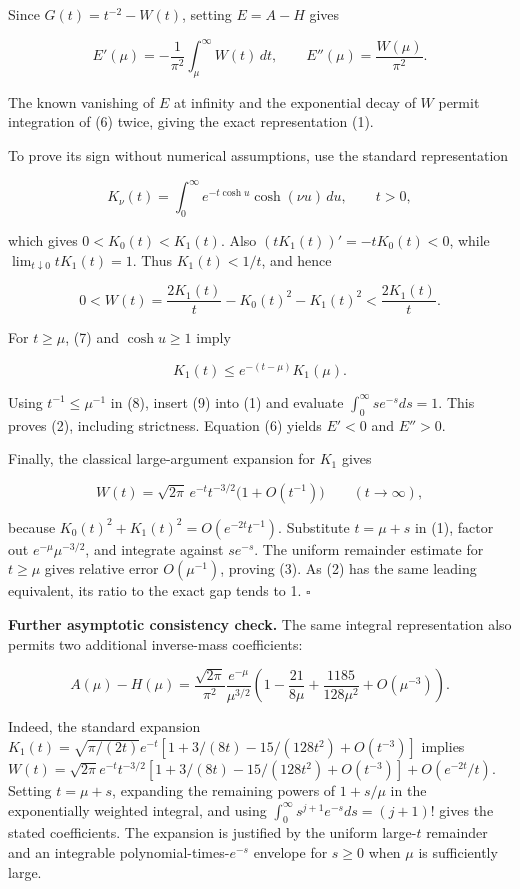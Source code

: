 \documentclass[
  10pt,
  a4paper,
]{article}
\begin{document}
Since \(G(t)=t^{-2}-W(t)\), setting \(E=A-H\) gives

\[
E'(\mu)=-\frac1{\pi^2}\int_\mu^\infty W(t)\,dt,
\qquad E''(\mu)=\frac{W(\mu)}{\pi^2}.
\tag{6}
\]

The known vanishing of \(E\) at infinity and the exponential decay of \(W\) permit integration of (6) twice, giving the exact representation (1).

To prove its sign without numerical assumptions, use the standard representation

\[
K_\nu(t)=\int_0^\infty e^{-t\cosh u}\cosh(\nu u)\,du,
\qquad t>0,
\tag{7}
\]

which gives \(0<K_0(t)<K_1(t)\). Also \((tK_1(t))'=-tK_0(t)<0\), while \(\lim_{t\downarrow0}tK_1(t)=1\). Thus \(K_1(t)<1/t\), and hence

\[
0<W(t)=\frac{2K_1(t)}t-K_0(t)^2-K_1(t)^2
<\frac{2K_1(t)}t.
\tag{8}
\]

For \(t\ge\mu\), (7) and \(\cosh u\ge1\) imply

\[
K_1(t)\le e^{-(t-\mu)}K_1(\mu).
\tag{9}
\]

Using \(t^{-1}\le\mu^{-1}\) in (8), insert (9) into (1) and evaluate \(\int_0^\infty se^{-s}ds=1\). This proves (2), including strictness. Equation (6) yields \(E'<0\) and \(E''>0\).

Finally, the classical large-argument expansion for \(K_1\) gives

\[
W(t)=\sqrt{2\pi}\,e^{-t}t^{-3/2}\bigl(1+O(t^{-1})\bigr)
\qquad(t\to\infty),
\tag{10}
\]

because \(K_0(t)^2+K_1(t)^2=O(e^{-2t}t^{-1})\). Substitute \(t=\mu+s\) in (1), factor out \(e^{-\mu}\mu^{-3/2}\), and integrate against \(se^{-s}\). The uniform remainder estimate for \(t\ge\mu\) gives relative error \(O(\mu^{-1})\), proving (3). As (2) has the same leading equivalent, its ratio to the exact gap tends to 1. \(\square\)

\textbf{Further asymptotic consistency check.} The same integral representation also permits two additional inverse-mass coefficients:

\[
A(\mu)-H(\mu)=\frac{\sqrt{2\pi}}{\pi^2}\frac{e^{-\mu}}{\mu^{3/2}}\left(1-\frac{21}{8\mu}+\frac{1185}{128\mu^2}+O(\mu^{-3})\right).
\]

Indeed, the standard expansion \(K_1(t)=\sqrt{\pi/(2t)}e^{-t}[1+3/(8t)-15/(128t^2)+O(t^{-3})]\) implies \(W(t)=\sqrt{2\pi}e^{-t}t^{-3/2}[1+3/(8t)-15/(128t^2)+O(t^{-3})]+O(e^{-2t}/t)\). Setting \(t=\mu+s\), expanding the remaining powers of \(1+s/\mu\) in the exponentially weighted integral, and using \(\int_0^\infty s^{j+1}e^{-s}ds=(j+1)!\) gives the stated coefficients. The expansion is justified by the uniform large-\(t\) remainder and an integrable polynomial-times-\(e^{-s}\) envelope for \(s\ge0\) when \(\mu\) is sufficiently large.
\end{document}
